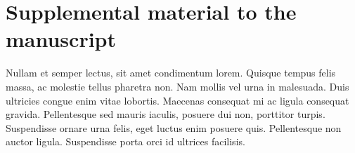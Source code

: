 \newpage

\section*{Supplemental material to the manuscript}


Nullam et semper lectus, sit amet condimentum lorem. Quisque tempus felis massa, ac molestie tellus pharetra non. Nam mollis vel urna in malesuada. Duis ultricies congue enim vitae lobortis. Maecenas consequat mi ac ligula consequat gravida. Pellentesque sed mauris iaculis, posuere dui non, porttitor turpis. Suspendisse ornare urna felis, eget luctus enim posuere quis. Pellentesque non auctor ligula. Suspendisse porta orci id ultrices facilisis.
